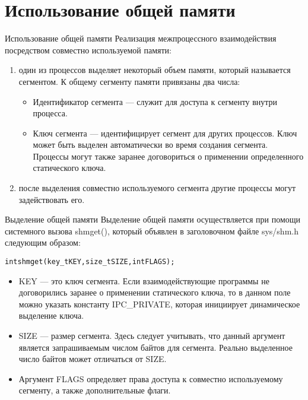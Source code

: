 \documentclass{beamer}
\begin{document}
\section{Использование общей памяти}

\begin{frame}[fragile]{Использование общей памяти}
Реализация межпроцессного взаимодействия посредством совместно используемой памяти:
\begin{enumerate}
\item один из процессов выделяет некоторый объем памяти, который называется сегментом. К общему сегменту памяти привязаны два числа:
\begin{itemize}
\item Идентификатор сегмента — служит для доступа к сегменту внутри процесса.
\item Ключ сегмента — идентифицирует сегмент для других процессов. Ключ может
быть выделен автоматически во время создания сегмента. Процессы могут также заранее договориться о применении определенного статического ключа.
\end{itemize}
\item после выделения совместно используемого сегмента другие процессы могут задействовать его. 
\end{enumerate}
\end{frame}

\begin{frame}[fragile]{Выделение общей памяти}
Выделение общей памяти осуществляется при помощи системного вызова shmget(), который объявлен в заголовочном файле sys/shm.h следующим образом:
\begin{alltt}
int shmget (key_t KEY, size_t SIZE, int FLAGS);
\end{alltt}
\begin{itemize}
\item KEY — это ключ сегмента. Если взаимодействующие программы не договорились заранее о применении статического ключа, то в данном поле можно указать константу IPC\_PRIVATE, которая инициирует динамическое выделение ключа.
\item SIZE — размер сегмента. Здесь следует учитывать, что данный аргумент является запрашиваемым числом байтов для сегмента. Реально выделенное число байтов может отличаться от SIZE.
\item Аргумент FLAGS определяет права доступа к совместно используемому сегменту, а также дополнительные флаги.
\end{itemize}
\end{frame}
\end{document}
